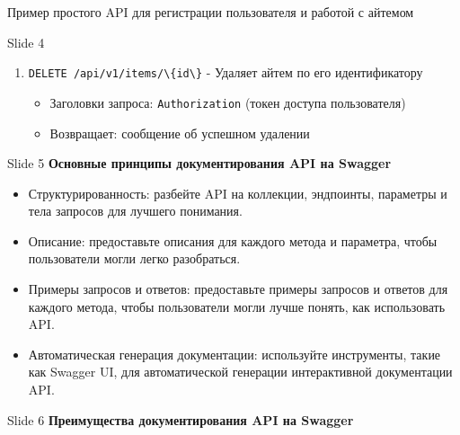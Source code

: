 \documentclass[
  ignorenonframetext,
  aspectratio=169,
  aspectratio=169]{beamer}
\newcommand{\passthrough}[1]{#1}
\providecommand{\tightlist}{%
  \setlength{\itemsep}{0pt}\setlength{\parskip}{0pt}}
\begin{document}
\begin{frame}[fragile]{Пример простого API для регистрации пользователя
и работой с айтемом}
\begin{block}{Slide 4}
\begin{enumerate}
  \begin{itemize}
  \tightlist
  \item
    Заголовки запроса: \passthrough{\lstinline!Authorization!} (токен
    доступа пользователя)
  \item
    Параметры запроса: \passthrough{\lstinline!name!},
    \passthrough{\lstinline!description!}
  \item
    Возвращает: обновленную информацию об айтеме
  \end{itemize}
\item
  \passthrough{\lstinline!DELETE /api/v1/items/\{id\}!} - Удаляет айтем
  по его идентификатору

  \begin{itemize}
  \tightlist
  \item
    Заголовки запроса: \passthrough{\lstinline!Authorization!} (токен
    доступа пользователя)
  \item
    Возвращает: сообщение об успешном удалении
  \end{itemize}
\end{enumerate}
\end{block}

\begin{block}{Slide 5}
\protect\hypertarget{slide-5}{}
\textbf{Основные принципы документирования API на Swagger}

\begin{itemize}
\tightlist
\item
  Структурированность: разбейте API на коллекции, эндпоинты, параметры и
  тела запросов для лучшего понимания.
\item
  Описание: предоставьте описания для каждого метода и параметра, чтобы
  пользователи могли легко разобраться.
\item
  Примеры запросов и ответов: предоставьте примеры запросов и ответов
  для каждого метода, чтобы пользователи могли лучше понять, как
  использовать API.
\item
  Автоматическая генерация документации: используйте инструменты, такие
  как Swagger UI, для автоматической генерации интерактивной
  документации API.
\end{itemize}
\end{block}

\begin{block}{Slide 6}
\protect\hypertarget{slide-6}{}
\textbf{Преимущества документирования API на Swagger}


\end{block}
\end{frame}
\end{document}
